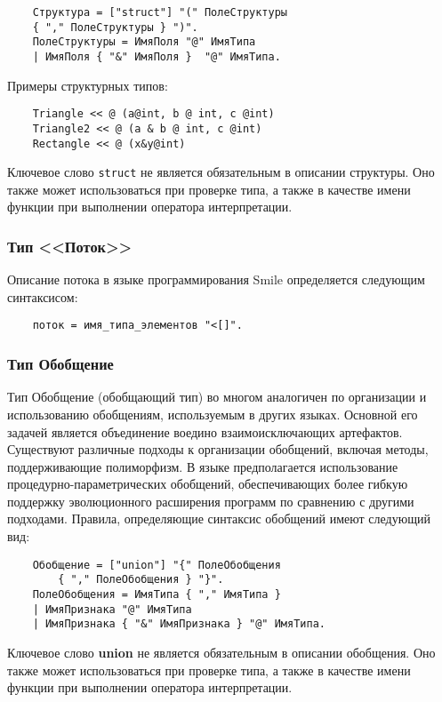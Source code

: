 {\begin{verbatim}
    Структура = ["struct"] "(" ПолеСтруктуры
    { "," ПолеСтруктуры } ")".
    ПолеСтруктуры = ИмяПоля "@" ИмяТипа
    | ИмяПоля { "&" ИмяПоля }  "@" ИмяТипа.
\end{verbatim}

Примеры структурных типов:

\begin{verbatim}
    Triangle << @ (a@int, b @ int, c @int)
    Triangle2 << @ (a & b @ int, c @int)
    Rectangle << @ (x&y@int)
\end{verbatim}

Ключевое слово \verb|struct| не является обязательным в описании структуры. Оно также может использоваться при проверке типа, а также в качестве имени функции при выполнении оператора интерпретации.


\subsubsection{Тип <<Поток>>}

Описание потока в языке программирования Smile определяется следующим синтаксисом:
\begin{verbatim}
    поток = имя_типа_элементов "<[]".
\end{verbatim}


\subsubsection{Тип Обобщение}

Тип Обобщение (обобщающий тип) во многом аналогичен по организации и использованию обобщениям, используемым в других языках. Основной его задачей является объединение воедино взаимоисключающих артефактов. Существуют различные подходы к организации обобщений, включая методы, поддерживающие полиморфизм. В языке предполагается использование процедурно-параметрических обобщений, обеспечивающих более гибкую поддержку эволюционного расширения программ по сравнению с другими подходами. Правила, определяющие синтаксис обобщений имеют следующий вид:

\begin{verbatim}
    Обобщение = ["union"] "{" ПолеОбобщения
        { "," ПолеОбобщения } "}".
    ПолеОбобщения = ИмяТипа { "," ИмяТипа }
    | ИмяПризнака "@" ИмяТипа
    | ИмяПризнака { "&" ИмяПризнака } "@" ИмяТипа.
\end{verbatim}


Ключевое слово \textbf{union} не является обязательным в описании обобщения. Оно также может использоваться при проверке типа, а также в качестве имени функции при выполнении оператора интерпретации.

}

